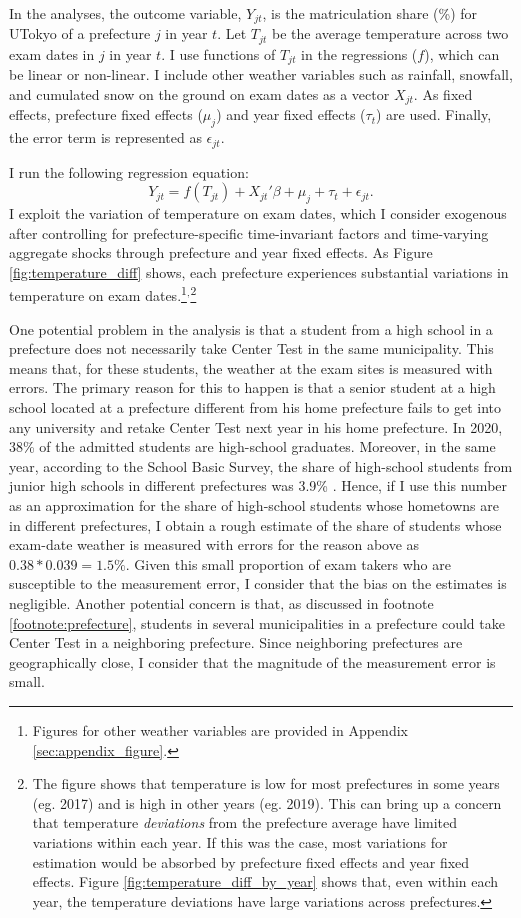 \documentclass[12pt,letterpaper]{article}
\begin{document}
In the analyses, the outcome variable, $Y_{jt}$, is the matriculation share (\%) for UTokyo of a prefecture $j$ in year $t$.
Let $T_{jt}$ be the average temperature across two exam dates in $j$ in year $t$.
I use functions of $T_{jt}$ in the regressions ($f$), which can be linear or non-linear.
I include other weather variables such as rainfall, snowfall, and cumulated snow on the ground on exam dates as a vector $X_{jt}$.
As fixed effects, prefecture fixed effects ($\mu_j$) and year fixed effects ($\tau_t$) are used.
Finally, the error term is represented as $\epsilon_{jt}$.

I run the following regression equation:
\begin{equation*}
  Y_{jt} = f(T_{jt}) + X_{jt}' \beta + \mu_j + \tau_t + \epsilon_{jt}.
\end{equation*}
I exploit the variation of temperature on exam dates, which I consider exogenous after controlling for prefecture-specific time-invariant factors and time-varying aggregate shocks through prefecture and year fixed effects.
As Figure \ref{fig:temperature_diff} shows, each prefecture experiences substantial variations in temperature on exam dates.\footnote{
  Figures for other weather variables are provided in Appendix \ref{sec:appendix_figure}.
}$^,$\footnote{
  The figure shows that temperature is low for most prefectures in some years (eg. 2017) and is high in other years (eg. 2019).
  This can bring up a concern that temperature \textit{deviations} from the prefecture average have limited variations within each year.
  If this was the case, most variations for estimation would be absorbed by prefecture fixed effects and year fixed effects.
  Figure \ref{fig:temperature_diff_by_year} shows that, even within each year, the temperature deviations have large variations across prefectures.
}

One potential problem in the analysis is that a student from a high school in a prefecture does not necessarily take Center Test in the same municipality.
This means that, for these students, the weather at the exam sites is measured with errors.
The primary reason for this to happen is that a senior student at a high school located at a prefecture different from his home prefecture fails to get into any university and retake Center Test next year in his home prefecture.
In 2020, 38\% of the admitted students are high-school graduates.
Moreover, in the same year, according to the School Basic Survey, the share of high-school students from junior high schools in different prefectures was 3.9\% \citep{eStat}.
Hence, if I use this number as an approximation for the share of high-school students whose hometowns are in different prefectures, I obtain a rough estimate of the share of students whose exam-date weather is measured with errors for the reason above as $0.38 * 0.039 = 1.5\%$. 
Given this small proportion of exam takers who are susceptible to the measurement error, I consider that the bias on the estimates is negligible.
Another potential concern is that, as discussed in footnote \ref{footnote:prefecture}, students in several municipalities in a prefecture could take Center Test in a neighboring prefecture.
Since neighboring prefectures are geographically close, I consider that the magnitude of the measurement error is small.
\end{document}
